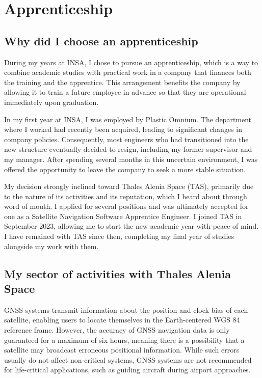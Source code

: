 \section{Apprenticeship}

\subsection{Why did I choose an apprenticeship}

During my years at INSA, I chose to pursue an apprenticeship, which is a way to combine academic studies with practical work in a company that finances both the training and the apprentice. This arrangement benefits the company by allowing it to train a future employee in advance so that they are operational immediately upon graduation.

In my first year at INSA, I was employed by Plastic Omnium. The department where I worked had recently been acquired, leading to significant changes in company policies. Consequently, most engineers who had transitioned into the new structure eventually decided to resign, including my former supervisor and my manager. After spending several months in this uncertain environment, I was offered the opportunity to leave the company to seek a more stable situation.

My decision strongly inclined toward Thales Alenia Space (TAS), primarily due to the nature of its activities and its reputation, which I heard about through word of mouth. I applied for several positions and was ultimately accepted for one as a Satellite Navigation Software Apprentice Engineer. I joined TAS in September 2023, allowing me to start the new academic year with peace of mind. I have remained with TAS since then, completing my final year of studies alongside my work with them.

\subsection{My sector of activities with Thales Alenia Space}

GNSS systems transmit information about the position and clock bias of each satellite, enabling users to locate themselves in the Earth-centered WGS 84 reference frame. However, the accuracy of GNSS navigation data is only guaranteed for a maximum of six hours, meaning there is a possibility that a satellite may broadcast erroneous positional information. While such errors usually do not affect non-critical systems, GNSS systems are not recommended for life-critical applications, such as guiding aircraft during airport approaches.

